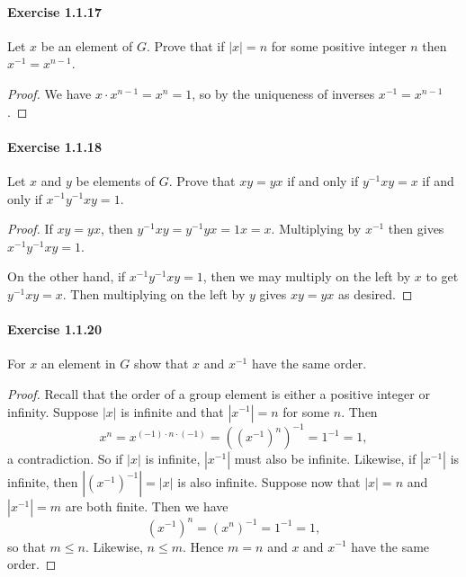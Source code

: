 \documentclass{article}
\theoremstyle{definition}
\begin{document}
\paragraph{Exercise 1.1.17} Let $x$ be an element of $G$. Prove that if $|x|=n$ for some positive integer $n$ then $x^{-1}=x^{n-1}$.
\begin{proof}
    We have $x \cdot x^{n-1}=x^n=1$, so by the uniqueness of inverses $x^{-1}=x^{n-1}$.
\end{proof}



\paragraph{Exercise 1.1.18} Let $x$ and $y$ be elements of $G$. Prove that $xy=yx$ if and only if $y^{-1}xy=x$ if and only if $x^{-1}y^{-1}xy=1$.
\begin{proof}
If $x y=y x$, then $y^{-1} x y=y^{-1} y x=1 x=x$. Multiplying by $x^{-1}$ then gives $x^{-1} y^{-1} x y=1$.

On the other hand, if $x^{-1} y^{-1} x y=1$, then we may multiply on the left by $x$ to get $y^{-1} x y=x$. Then multiplying on the left by $y$ gives $x y=y x$ as desired.
\end{proof}




\paragraph{Exercise 1.1.20} For $x$ an element in $G$ show that $x$ and $x^{-1}$ have the same order.
\begin{proof}
    Recall that the order of a group element is either a positive integer or infinity.
Suppose $|x|$ is infinite and that $\left|x^{-1}\right|=n$ for some $n$. Then
$$
x^n=x^{(-1) \cdot n \cdot(-1)}=\left(\left(x^{-1}\right)^n\right)^{-1}=1^{-1}=1,
$$
a contradiction. So if $|x|$ is infinite, $\left|x^{-1}\right|$ must also be infinite. Likewise, if $\left|x^{-1}\right|$ is infinite, then $\left|\left(x^{-1}\right)^{-1}\right|=|x|$ is also infinite.
Suppose now that $|x|=n$ and $\left|x^{-1}\right|=m$ are both finite. Then we have
$$
\left(x^{-1}\right)^n=\left(x^n\right)^{-1}=1^{-1}=1,
$$
so that $m \leq n$. Likewise, $n \leq m$. Hence $m=n$ and $x$ and $x^{-1}$ have the same order.
\end{proof}
\end{document}
